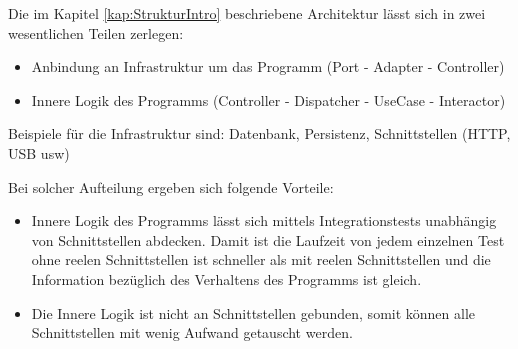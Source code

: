 
    Die im Kapitel \ref{kap:StrukturIntro} beschriebene Architektur lässt sich in zwei wesentlichen Teilen zerlegen:
    \begin{itemize}
        \item Anbindung an Infrastruktur um das Programm (Port - Adapter - Controller)
        \item Innere Logik des Programms (Controller - Dispatcher - UseCase - Interactor)
    \end{itemize}

    Beispiele für die Infrastruktur sind: Datenbank, Persistenz, Schnittstellen (HTTP, USB usw)

    Bei solcher Aufteilung ergeben sich folgende Vorteile:
    \begin{itemize}
        \item Innere Logik des Programms lässt sich mittels Integrationstests unabhängig von Schnittstellen abdecken.
        Damit ist die Laufzeit von jedem einzelnen Test ohne reelen Schnittstellen ist schneller als mit reelen Schnittstellen und 
        die Information bezüglich des Verhaltens des Programms ist gleich.
        \item Die Innere Logik ist nicht an Schnittstellen gebunden, 
        somit können alle Schnittstellen mit wenig Aufwand getauscht werden.
    \end{itemize}
